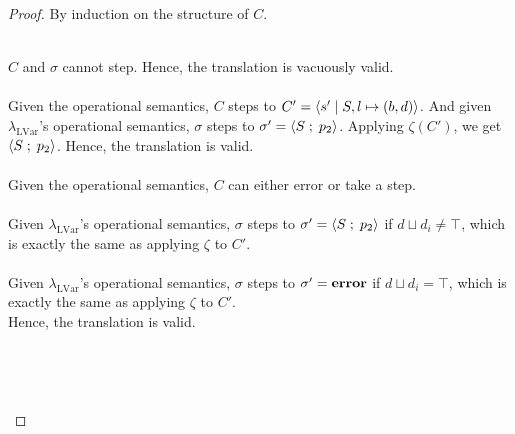 \documentclass[main.tex]{subfiles}
\begin{document}
\begin{proof}
  By induction on the structure of $C$.

 \\
 $C$ and $\sigma$ cannot step. Hence, the translation is vacuously valid.\\


 \\
  Given the operational semantics, $C$ steps to $C' = \langle {s'}\;\vert\;{S, l \mapsto (b,
    d)} \rangle$.
  And given $\lambda_{\text{LVar}}$'s operational semantics, $\sigma$ steps to
  $\sigma' = \langle {S} \; ; \;{p_2} \rangle$. Applying $\zeta (C')$, we get
  $\langle {S} \; ; \;{p_2} \rangle$. Hence, the translation is valid. \\


  \\
  Given the operational semantics, $C$ can either error or take a step.\\

     \\
    Given $\lambda_{\text{LVar}}$'s operational semantics, $\sigma$ steps to
    $\sigma' = \langle {S} \; ; \;{p_2} \rangle$ if $d \sqcup d_{i} \neq \top$, which is exactly
    the same as applying $\zeta$ to $C'$. \\
    

    \\
     Given $\lambda_{\text{LVar}}$'s operational semantics, $\sigma$ steps to
    $\sigma' = \mathbf{error}$ if $d \sqcup d_{i} = \top$, which is exactly
    the same as applying $\zeta$ to $C'$. \\

  Hence, the translation is valid. \\

  \\
  \\
   \\
   \\
  
  
\end{proof}
\end{document}
